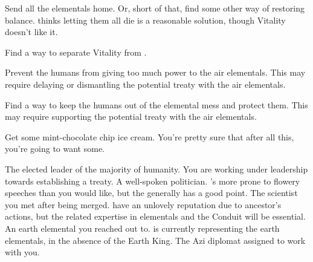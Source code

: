 \documentclass[char]{elementals}
\begin{document}
\begin{itemz}[Goals]
	\item  Send all the elementals home.  Or, short of that, find some other way of restoring balance.  \cAvatar{} thinks letting them all die is a reasonable solution, though Vitality doesn't like it.
	\item  Find a way to separate Vitality from \cAvatar{}.
	\item  Prevent the humans from giving too much power to the air elementals.  This may require delaying or dismantling the potential treaty with the air elementals.
	\item  Find a way to keep the humans out of the elemental mess and protect them.  This may require supporting the potential treaty with the air elementals.
	\item  Get some mint-chocolate chip ice cream.  You're pretty sure that after all this, you're going to want some.
\end{itemz}

\begin{contacts}
	\contact{\cLeader{}}  The elected leader of the majority of humanity.  You are working under \cLeader{\their} leadership towards establishing a treaty.
	\contact{\cDema{}}  A well-spoken politician.  \cDema{\They}'s more prone to flowery speeches than you would like, but the \cDema{\human} generally has a good point.
	\contact{\cGD{}}  The scientist you met after being merged.  \cGD{\They} have an unlovely reputation due to \cGD{\their} ancestor's actions, but the related expertise in elementals and the Conduit will be essential.
	\contact{\cLoyal{}}  An earth elemental you reached out to.  \cLoyal{\They} is currently representing the earth elementals, in the absence of the Earth King.
	\contact{\cDiplomat{}}  The Azi diplomat assigned to work with you.
\end{contacts}
\end{document}
